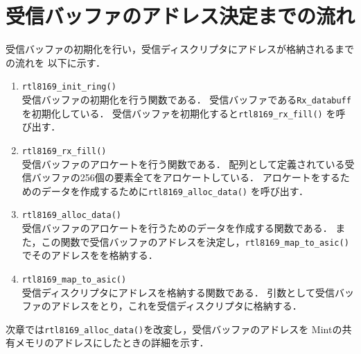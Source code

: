 \documentclass[12pt]{jsarticle}
\begin{document}
\section{受信バッファのアドレス決定までの流れ}
受信バッファの初期化を行い，受信ディスクリプタにアドレスが格納されるまでの流れを
以下に示す．
\begin{enumerate}
    \item {\tt rtl8169\_init\_ring()}\\
        受信バッファの初期化を行う関数である．
        受信バッファである{\tt Rx\_databuff}を初期化している．
        受信バッファを初期化すると{\tt rtl8169\_rx\_fill()}
        を呼び出す．
    \item {\tt rtl8169\_rx\_fill()} \\
        受信バッファのアロケートを行う関数である．
        配列として定義されている受信バッファの256個の要素全てをアロケートしている．
        アロケートをするためのデータを作成するために{\tt rtl8169\_alloc\_data()}
        を呼び出す．
    \item {\tt rtl8169\_alloc\_data()}\\
        受信バッファのアロケートを行うためのデータを作成する関数である．
        また，この関数で受信バッファのアドレスを決定し，{\tt rtl8169\_map\_to\_asic()}
        でそのアドレスをを格納する．
    \item {\tt rtl8169\_map\_to\_asic()}\\
        受信ディスクリプタにアドレスを格納する関数である．
        引数として受信バッファのアドレスをとり，これを受信ディスクリプタに格納する．
\end{enumerate}

次章では{\tt rtl8169\_alloc\_data()}を改変し，受信バッファのアドレスを
Mintの共有メモリのアドレスにしたときの詳細を示す．
\end{document}
